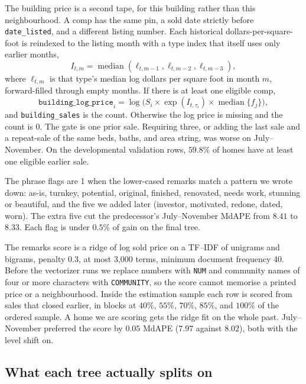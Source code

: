 \documentclass[11pt]{article}
\begin{document}
The building price is a second tape, for this building rather than this neighbourhood. A comp has the same pin, a sold date strictly before \texttt{date\_listed}, and a different listing number. Each historical dollars-per-square-foot is reindexed to the listing month with a type index that itself uses only earlier months,
\[
I_{t,m} = \operatorname{median}(\ell_{t,m-1},\ell_{t,m-2},\ell_{t,m-3}),
\]
where \(\ell_{t,m}\) is that type's median log dollars per square foot in month \(m\), forward-filled through empty months. If there is at least one eligible comp,
\[
\texttt{building\_log\_price}_i = \log\bigl(S_i \times \exp(I_{t,\tau_i})\times\operatorname{median}\{f_j\}\bigr),
\]
and \texttt{building\_sales} is the count. Otherwise the log price is missing and the count is 0. The gate is one prior sale. Requiring three, or adding the last sale and a repeat-sale of the same beds, baths, and area string, was worse on July--November. On the developmental validation rows, \(59.8\%\) of homes have at least one eligible earlier sale.

The phrase flags are 1 when the lower-cased remarks match a pattern we wrote down: as-is, turnkey, potential, original, finished, renovated, needs work, stunning or beautiful, and the five we added later (investor, motivated, redone, dated, worn). The extra five cut the predecessor's July--November MdAPE from \(8.41\) to \(8.33\). Each flag is under \(0.5\%\) of gain on the final tree.

The remarks score is a ridge of log sold price on a TF--IDF of unigrams and bigrams, penalty \(0.3\), at most 3{,}000 terms, minimum document frequency 40. Before the vectorizer runs we replace numbers with \texttt{NUM} and community names of four or more characters with \texttt{COMMUNITY}, so the score cannot memorise a printed price or a neighbourhood. Inside the estimation sample each row is scored from sales that closed earlier, in blocks at \(40\%\), \(55\%\), \(70\%\), \(85\%\), and \(100\%\) of the ordered sample. A home we are scoring gets the ridge fit on the whole past. July--November preferred the score by \(0.05\) MdAPE (\(7.97\) against \(8.02\)), both with the level shift on.

\subsection{What each tree actually splits on}
\end{document}
